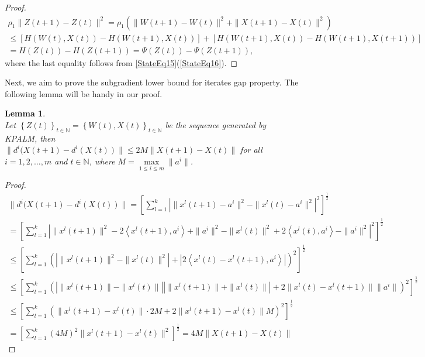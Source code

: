 \documentclass[11pt]{article}
\numberwithin{equation}{section}
\newtheorem{lemma}{Lemma}[proposition]
\def\abs#1{\left\lvert#1\right\rvert}
\begin{document}
\begin{proof}
\begin{equation*}
	\begin{split}
	\rho_1 \|Z(t+1) - Z(t)\|^2 
	= \rho_1 \left( \|W(t+1) - W(t)\|^2 + \|X(t+1) - X(t)\|^2 \right) \\
	\leq \left[ H(W(t),X(t)) - H(W(t+1),X(t)) \right] + \left[ H(W(t+1),X(t)) - H(W(t+1),X(t+1)) \right] \\
	= H(Z(t)) - H(Z(t+1)) = \Psi(Z(t)) - \Psi(Z(t+1)),
	\end{split}
\end{equation*}
where the last equality follows from \cref{StateEq15}(\ref{StateEq16}).
\end{proof}

Next, we aim to prove the subgradient lower bound for iterates gap property. The following lemma will be handy in our proof.

\begin{lemma} \label{StateEq11} \ \\
Let $\left\lbrace Z(t) \right\rbrace_{t \in \mathbb{N}} = \left\lbrace W(t) , X(t) \right\rbrace_{t \in \mathbb{N}}$ be the sequence generated by KPALM, then \\ $\| d^i(X(t+1) - d^i(X(t)) \| \leq 2M \| X(t+1) - X(t)\|$ for all $i=1, 2, \ldots ,m$ and $t \in \mathbb{N}$, where $M = \max\limits_{1 \leq i \leq m} \|a^i\|$.
\end{lemma}

\begin{proof}
\begin{equation*}
	\begin{split}
	\| d^i(X(t+1) - d^i(X(t)) \| = \left[ \sum\limits_{l=1}^{k} \abs{ \|x^l(t+1) - a^i\|^2 - \| x^l(t) -a^i\|^2 }^2 \right]^{\frac{1}{2}} \\
	= \left[ \sum\limits_{l=1}^{k} \abs{ \|x^l(t+1)\|^2 - 2\left\langle x^l(t+1),a^i \right\rangle + \|a^i\|^2 - \|x^l(t)\|^2 + 2\left\langle x^l(t),a^i \right\rangle - \|a^i\|^2 }^2 \right]^{\frac{1}{2}} \\
	\leq \left[ \sum\limits_{l=1}^{k} \left( \abs{ \|x^l(t+1)\|^2 - \|x^l(t)\|^2 } + \abs{ 2\left\langle x^l(t) - x^l(t+1) , a^i \right\rangle } \right)^2 \right]^{\frac{1}{2}} \\
	\leq \left[ \sum\limits_{l=1}^{k} \left( \abs{ \|x^l(t+1)\| - \|x^l(t)\| } \abs{ \|x^l(t+1)\| + \|x^l(t)\| } + 2 \| x^l(t) - x^l(t+1) \| \|a^i\| \right)^2 \right]^{\frac{1}{2}} \\
	\leq \left[ \sum\limits_{l=1}^{k} \left( \|x^l(t+1) - x^l(t)\| \cdot 2M + 2 \| x^l(t+1) - x^l(t) \| M \right)^2 \right]^{\frac{1}{2}} \\
	= \left[ \sum\limits_{l=1}^{k} (4M)^2 \|x^l(t+1) - x^l(t)\|^2 \right]^{\frac{1}{2}} 
	= 4M \| X(t+1) - X(t)\|
	\end{split}
\end{equation*}
\end{proof}
\end{document}
